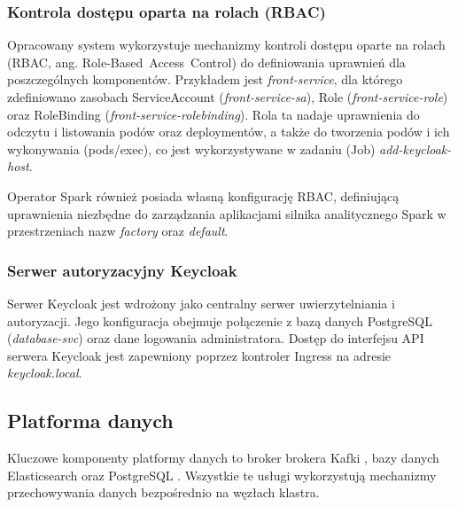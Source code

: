 \subsubsection{Kontrola dostępu oparta na rolach (RBAC)}
\label{subsubsec:RBAC}
Opracowany system wykorzystuje mechanizmy kontroli dostępu oparte na rolach (RBAC, ang. \mbox{Role-Based Access Control}) \cite{kubernetes_rbac_docs} do definiowania uprawnień dla poszczególnych komponentów. Przykładem jest \textit{front-service}, dla którego zdefiniowano zasobach ServiceAccount (\textit{front-service-sa}), Role (\textit{front-service-role}) oraz RoleBinding (\textit{front-service-rolebinding}). Rola ta nadaje uprawnienia do odczytu i listowania podów oraz deploymentów, a także do tworzenia podów i ich wykonywania (pods/exec), co jest wykorzystywane w zadaniu (Job) \textit{add-keycloak-host}.

Operator Spark również posiada własną konfigurację RBAC, definiującą uprawnienia niezbędne do zarządzania aplikacjami silnika analitycznego Spark w przestrzeniach nazw \textit{factory} oraz \textit{default}.

\subsubsection{Serwer autoryzacyjny Keycloak}
Serwer Keycloak \cite{keycloak_docs} jest wdrożony jako centralny serwer uwierzytelniania i autoryzacji. Jego konfiguracja obejmuje połączenie z bazą danych PostgreSQL (\textit{database-svc}) oraz dane logowania administratora. Dostęp do interfejsu API serwera Keycloak jest zapewniony poprzez kontroler Ingress na adresie \textit{keycloak.local}.

\subsection{Platforma danych}

Kluczowe komponenty platformy danych to broker brokera Kafki \cite{kafka}, bazy danych Elasticsearch \cite{elasticsearch_docs} oraz PostgreSQL \cite{postgresql_docs}. Wszystkie te usługi wykorzystują mechanizmy przechowywania danych bezpośrednio na węzłach klastra.

